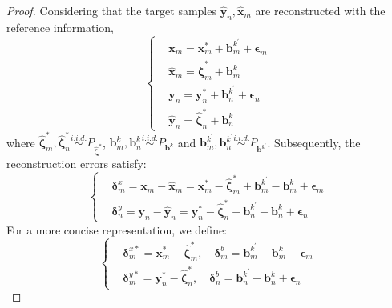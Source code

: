 \documentclass{article}
\begin{document}
\begin{proof}
Considering that the target samples $\widehat{\bm{y}}_n, \widehat{\bm{x}}_m$ are reconstructed with the reference information,
\begin{equation}
    \begin{cases}
        & \bm{x}_m = \bm{x}_m^* + \bm{b}_m^{k^\prime} + \bm{\epsilon}_m \\
        & \widehat{\bm{x}}_m = \widehat{\bm{\zeta}}_m^* + \bm{b}_m^k \\
        & \bm{y}_n = \bm{y}_n^* + \bm{b}_n^{k^\prime} + \bm{\epsilon}_n \\
        & \widehat{\bm{y}}_n = \widehat{\bm{\zeta}}_n^* + \bm{b}_n^k 
    \end{cases}
\end{equation}
where $\widehat{\bm{\zeta}}_m^*, \widehat{\bm{\zeta}}_n^* \stackrel{i.i.d.}{\sim} P_{\widehat{\bm{\zeta}}^*}$,
$\bm{b}_m^k, \bm{b}_n^k \stackrel{i.i.d.}{\sim} P_{\bm{b}^k}$ and $\bm{b}_m^{k^\prime}, \bm{b}_n^{k^\prime} \stackrel{i.i.d.}{\sim} P_{\bm{b}^{k^\prime}}$.
Subsequently, the reconstruction errors satisfy:
\begin{equation}
    \begin{cases}
        & \bm{\delta}_m^x = \bm{x}_m - \widehat{\bm{x}}_m = \bm{x}_m^* - \widehat{\bm{\zeta}}_m^* + \bm{b}_m^{k^\prime} - \bm{b}_m^k + \bm{\epsilon}_m \\
        & \bm{\delta}_n^y = \bm{y}_n - \widehat{\bm{y}}_n = \bm{y}_n^* - \widehat{\bm{\zeta}}_n^* + \bm{b}_n^{k^\prime} - \bm{b}_n^k + \bm{\epsilon}_n
    \end{cases}
\end{equation}
For a more concise representation, we define:
\begin{equation}
    \begin{cases}
        & \bm{\delta}_m^{x*} = \bm{x}_m^* - \widehat{\bm{\zeta}}_m^*, \quad \bm{\delta}_m^b = \bm{b}_m^{k^\prime} - \bm{b}_m^k + \bm{\epsilon}_m \\
        & \bm{\delta}_m^{y*} = \bm{y}_n^* - \widehat{\bm{\zeta}}_n^*, \quad \bm{\delta}_n^b = \bm{b}_n^{k^\prime} - \bm{b}_n^k + \bm{\epsilon}_n
    \end{cases}
\end{equation}


\end{proof}
\end{document}
